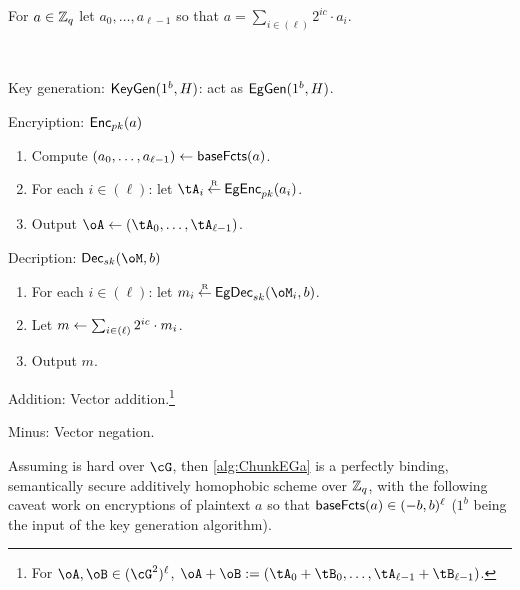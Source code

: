 \begin{definition}\label{def:basefactor}
For $a\in {\mathbb Z}_q$ let $a_0,\ldots,a_{\ell-1}$ so that $a =  \sum_{i \in (\ell)}    2^{i c} \cdot a_i$.
\end{definition}


\begin{algorithm}\label{alg:ChunkEGa}~
	
	\item[Key generation:] $\mathsf{KeyGen}(1^b,H)$: act as $\mathsf{EgGen}(1^b,H)$.
	
	\item[Encryiption:] $\mathsf{Enc}_{pk}(a)$
	
	\begin{enumerate}
		\item Compute $(a_0,\ldots,a_{\ell-1}) \leftarrow \mathsf{baseFcts}(a)$.
		
		\item For each $i\in (\ell)$: let $\tA_i \getsr \EgEnc_\pk(a_i)$.
		
		\item Output $\oA \asn (\tA_0,\ldots, \tA_{\ell-1})$.
		
	\end{enumerate}
	 
	\item[Decription:] $\Dec_\sk(\oM,b)$   
	\begin{enumerate}
		\item 	 For each $i\in (\ell)$: let $m_i \getsr \EgDec_\sk(\oM_i,b)$.
		
		\item Let  $m \leftarrow \sum_{i \in (\ell)}   2^{i c} \cdot  m_i $.
		
		\item Output $m$.
	\end{enumerate}
	
	\item[Addition:] Vector addition.\footnote{For $\oA,\oB \in (\cG^2)^\ell$, $\oA +\oB \eqdef (\tA_0+\tB_0,\ldots,\tA_{\ell-1}+\tB_{\ell-1})$.}
	
	\item[Minus:]  Vector negation.
	                     
	
\end{algorithm}


\begin{theorem}\label{thm:ChunkEG}
	Assuming \DDH is hard over $\cG$, then \cref{alg:ChunkEGa} is  a perfectly binding,  semantically secure additively homophobic scheme over ${\mathbb Z}_q$, with the following caveat work on encryptions of plaintext  $a$ so that $\mathsf{baseFcts}(a)\in (-b,b)^\ell$ ($1^b$ being the input of the key generation algorithm).
\end{theorem}


